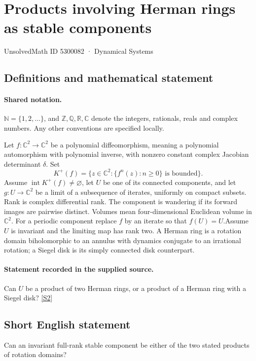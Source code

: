 \documentclass[11pt]{article}
\newcommand{\sref}[2]{\hyperlink{source:#1:#2}{[S#2]}}
\begin{document}
\setcounter{section}{5300081}
\section{Products involving Herman rings as stable components}\label{5300082}
{\small\sffamily UnsolvedMath ID 5300082 · Dynamical Systems}
\subsection{Definitions and mathematical statement}

\paragraph{Shared notation.}$\mathbb N=\{1,2,\ldots\}$, and $\mathbb Z,\mathbb Q,\mathbb R,\mathbb C$ denote the integers, rationals, reals and complex numbers. Any other conventions are specified locally.


Let $f:\mathbb C^2\to\mathbb C^2$ be a polynomial diffeomorphism, meaning a polynomial automorphism with polynomial inverse, with nonzero constant complex Jacobian determinant $\delta$. Set
\[K^+(f)=\{z\in\mathbb C^2:\{f^n(z):n\geq0\}\text{ is bounded}\}.\]
Assume $\operatorname{int}K^+(f)\ne\varnothing$, let $U$ be one of its connected components, and let $g:U\to\mathbb C^2$ be a limit of a subsequence of iterates, uniformly on compact subsets. Rank is complex differential rank. The component is wandering if its forward images are pairwise distinct. Volumes mean four-dimensional Euclidean volume in $\mathbb C^2$. For a periodic component replace $f$ by an iterate so that $f(U)=U$.Assume $U$ is invariant and the limiting map has rank two. A Herman ring is a rotation domain biholomorphic to an annulus with dynamics conjugate to an irrational rotation; a Siegel disk is its simply connected disk counterpart.
\paragraph{Statement recorded in the supplied source.}
Can $U$ be a product of two Herman rings, or a product of a Herman ring with a Siegel disk? \sref{5300082}{2}
\subsection{Short English statement}
Can an invariant full-rank stable component be either of the two stated products of rotation domains?
\end{document}
